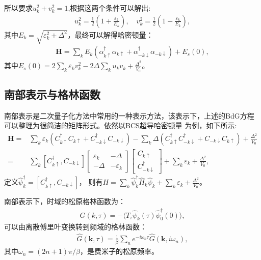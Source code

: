 \documentclass[12pt, a4paper, oneside, UTF8]{ctexbook}
\begin{document}
	所以要求$u_k^2+v_k^2=1$,根据这两个条件可以解出:
	\begin{eqnarray}
		u_k^2=\frac{1}{2}\left(1+\frac{\varepsilon_k}{E_k}\right),\quad v_k^2=\frac{1}{2}\left(1-\frac{\varepsilon_k}{E_k}\right),
	\end{eqnarray}
	其中$E_k=\sqrt{\varepsilon_k^2+\Delta^2}$，最终可以解得哈密顿量：
	\begin{eqnarray}
		\mathbf{H}=\sum_{k}E_k \left(\alpha^{\dag}_{k\uparrow} \alpha_{k\uparrow}+\alpha^{\dag}_{-k\downarrow}\alpha_{-k\downarrow}\right)+E_{s}(0),
	\end{eqnarray}
	其中$E_s (0) =2\sum_k \varepsilon_k v_k^2-2\Delta\sum_k u_kv_k+\frac{\Delta^2}{V_0}$。

	\subsection{南部表示与格林函数}
	南部表示是二次量子化方法中常用的一种表示方法，该表示下，上述的BdG方程可以整理为很简洁的矩阵形式。依然以BCS超导哈密顿量
	为例，如下所示:
	\begin{align}
		\mathbf{H}=&\sum_{k}\varepsilon_{k}(C^{\dag}_{k \uparrow} C_{k \uparrow}+C^{\dag}_{-k \downarrow} C_{-k \downarrow})-
		\sum_{k}\Delta(C^{\dag}_{k \uparrow}C^{\dag}_{-k \downarrow}+C_{-k \downarrow}C_{k \uparrow})+\frac{\Delta^2}{V_0}\nonumber\\
		=&\sum_{k}\left[C^{\dag}_{k\uparrow},C_{-k\downarrow}\right]
		\left[
			\begin{matrix}
				\varepsilon_k & -\Delta\\
				-\Delta & -\varepsilon_k
			\end{matrix}
		\right]
		\left[
			\begin{matrix}
				C_{k\uparrow}\\
				C^{\dag}_{-k\downarrow}
			\end{matrix}
		\right]
		+\sum_k \varepsilon_k+\frac{\Delta^2}{V_0},
	\end{align}
	定义$\hat{\psi}^{\dag}_k=[C^{\dag}_{k\uparrow},C_{-k\downarrow}]$，
	则有$H=\sum_k \hat{\psi}^{\dag}_k \hat{H}_k \hat{\psi}_k+\sum_k \varepsilon_k+\frac{\Delta^2}{V_0}$。

	南部表示下，时域的松原格林函数为：
	\begin{eqnarray}
		\hat{G}\left(k,\tau \right)=-\langle T_\tau \hat{\psi}_k(\tau)\hat{\psi}^{\dag}_0 \left(0\right)\rangle,
	\end{eqnarray}
	可以由离散傅里叶变换转到频域的格林函数：
	\begin{eqnarray}
		\hat{G}(\mathbf{k},\tau)=\frac{1}{\beta}\sum_n e^{-i\omega_n \tau} \hat{G}(\mathbf{k},i\omega_n),
	\end{eqnarray}
	其中$\omega_n=(2n+1)\pi/\beta$，是费米子的松原频率。
\end{document}
